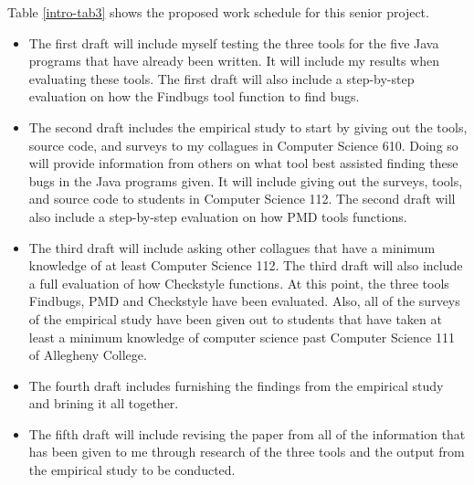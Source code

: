Table \ref{intro-tab3} shows the proposed work schedule for this senior project. 
\begin{itemize}
\item The first draft will include myself testing the three tools for the five Java programs that have already been written. It will include my results  when evaluating these tools. The first draft will also include a step-by-step evaluation on how the Findbugs tool function to find bugs.
\item The second draft includes the empirical study to start by giving out the tools, source code, and surveys to my collagues in Computer Science 610. Doing so will provide information from others on what tool best assisted finding these bugs in the Java programs given. It will include giving out the surveys, tools, and source code to students in Computer Science 112. The second draft will also include a step-by-step evaluation on how PMD tools functions. 
\item The third draft will include asking other collagues that have a minimum knowledge of at least Computer Science 112. The third draft will also include a full evaluation of how Checkstyle functions. At this point, the three tools Findbugs, PMD and Checkstyle have been evaluated. Also, all of the surveys of the empirical study have been given out to students that have taken at least a minimum knowledge of computer science past Computer Science 111 of Allegheny College. 
\item The fourth draft includes furnishing the findings from the empirical study and brining it all together. 
\item The fifth draft will include revising the paper from all of the information that has been given to me through research of the three tools and the output from the empirical study to be conducted.
\end{itemize}
